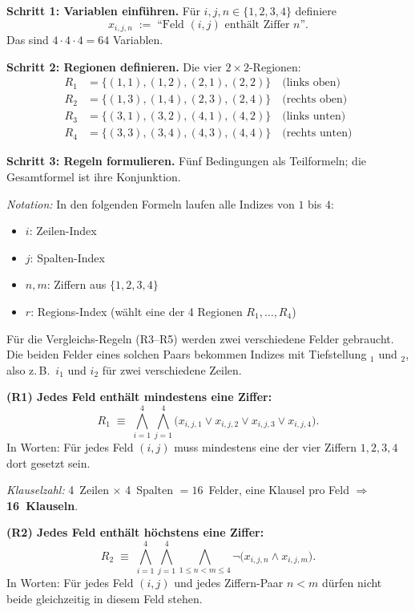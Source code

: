 \documentclass[a4paper,12pt]{article}
\begin{document}
\medskip
\textbf{Schritt 1: Variablen einf\"uhren.}
F\"ur $i,j,n \in \{1,2,3,4\}$ definiere
\[
x_{i,j,n} \;:=\; \text{``Feld $(i,j)$ enth\"alt Ziffer $n$''}.
\]
Das sind $4 \cdot 4 \cdot 4 = 64$ Variablen.

\medskip
\textbf{Schritt 2: Regionen definieren.}
Die vier $2 \times 2$-Regionen:
\begin{align*}
R_1 &= \{(1,1),(1,2),(2,1),(2,2)\} \quad \text{(links oben)} \\
R_2 &= \{(1,3),(1,4),(2,3),(2,4)\} \quad \text{(rechts oben)} \\
R_3 &= \{(3,1),(3,2),(4,1),(4,2)\} \quad \text{(links unten)} \\
R_4 &= \{(3,3),(3,4),(4,3),(4,4)\} \quad \text{(rechts unten)}
\end{align*}

\medskip
\textbf{Schritt 3: Regeln formulieren.}
F\"unf Bedingungen als Teilformeln; die Gesamtformel ist ihre
Konjunktion.

\smallskip
\textit{Notation:} In den folgenden Formeln laufen alle Indizes von
$1$ bis $4$:
\begin{itemize}[nosep]
\item $i$: Zeilen-Index
\item $j$: Spalten-Index
\item $n, m$: Ziffern aus $\{1,2,3,4\}$
\item $r$: Regions-Index \;(w\"ahlt eine der 4 Regionen $R_1, \ldots, R_4$)
\end{itemize}
F\"ur die Vergleichs-Regeln (R3--R5) werden zwei verschiedene Felder
gebraucht. Die beiden Felder eines solchen Paars bekommen Indizes
mit Tiefstellung $_1$ und $_2$, also z.\,B.\ $i_1$ und $i_2$ f\"ur zwei
verschiedene Zeilen.

\smallskip
\textbf{(R1) Jedes Feld enth\"alt mindestens eine Ziffer:}
\[
R_1 \;\equiv\; \bigwedge_{i=1}^{4} \bigwedge_{j=1}^{4}
\bigl(x_{i,j,1} \vee x_{i,j,2} \vee x_{i,j,3} \vee x_{i,j,4}\bigr).
\]
In Worten: F\"ur jedes Feld $(i,j)$ muss mindestens eine der vier
Ziffern $1, 2, 3, 4$ dort gesetzt sein.

\textit{Klauselzahl:} 4~Zeilen $\times$ 4~Spalten $= 16$~Felder,
eine Klausel pro Feld $\Rightarrow$ \textbf{16~Klauseln}.

\smallskip
\textbf{(R2) Jedes Feld enth\"alt h\"ochstens eine Ziffer:}
\[
R_2 \;\equiv\; \bigwedge_{i=1}^{4} \bigwedge_{j=1}^{4}
\bigwedge_{1 \le n < m \le 4}
\neg\bigl(x_{i,j,n} \wedge x_{i,j,m}\bigr).
\]
In Worten: F\"ur jedes Feld $(i,j)$ und jedes Ziffern-Paar $n < m$
d\"urfen nicht beide gleichzeitig in diesem Feld stehen.
\end{document}
